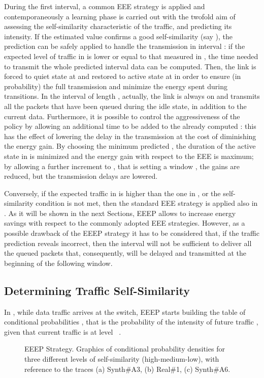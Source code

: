 \documentclass[journal,10pt,twoside,final]{IEEEtran}
\begin{document}
During the first interval, a common EEE strategy is applied and contemporaneously a learning phase is carried out with the twofold aim of assessing the self-similarity characteristic of the traffic, and predicting its intensity. If the estimated value  confirms a good self-similarity (say ), 
the prediction can be safely applied to handle the transmission in interval : if the expected level of traffic in  is lower or equal to that measured in , the time  needed to transmit the whole predicted interval data can be computed. 
Then, the link is forced to quiet state at  and restored to active state at  in order to ensure (in probability) the full transmission and minimize the energy spent during transitions.  
In the interval of length , actually, the link is always on and transmits all the packets that have been queued during the idle state, in addition to the current data. 
Furthermore, it is possible to control the aggressiveness of the policy by allowing an additional time  to be added to the already computed : this has the effect of lowering the delay in the transmission at the cost of diminishing the energy gain.
By choosing the minimum predicted , the duration of the active state in  is minimized and the energy gain with respect to the EEE is maximum; by allowing a further increment to , that is setting a window , the gains are reduced, but the transmission delays are lowered.

Conversely, if the expected traffic in  is higher than the one in , or the self-similarity condition is not met, then the standard EEE strategy is applied also in .
As it will be shown in the next Sections, EEEP allows to increase energy savings with respect to the commonly adopted EEE strategies. However, as a possible drawback of the EEEP strategy it has to be considered that, if the traffic prediction reveals incorrect, then the interval  will not be sufficient to deliver all the queued packets that, consequently, will be delayed and transmitted at the beginning of the following window. 


\subsection{Determining Traffic Self-Similarity}
\label{subsec:EEEP-self}
In , while data traffic arrives at the switch, EEEP starts building the table of conditional probabilities , that is the probability of the intensity of future traffic , given that current traffic  is at level ~\cite{ParkWillinger00}.
\begin{figure*}[!ht]
\centering
{}
\caption{EEEP Strategy. Graphics of conditional probability densities for three different levels of self-similarity (high-medium-low), with reference to the traces (a) Synth\#A3, (b) Real\#1, (c) Synth\#A6.}
\label{fig:CPD}
\end{figure*}
\end{document}
